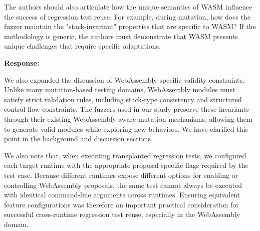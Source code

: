 \documentclass[11pt]{article}
\newenvironment{response}{%
    \par\vspace{10pt}
    \par\noindent\textbf{\color{tseblue}Response:}\par\nobreak\ignorespaces
}{%
    \par\vspace{15pt}
}
\newcounter{reviewernum}
\newcounter{cmtcounter}[reviewernum]
\newenvironment{rcomment}{%
    \stepcounter{cmtcounter}%
    \begin{revcomment}[R\thereviewernum{}.C\thecmtcounter{}.~Reviewer~\thereviewernum{}, Comment~\thecmtcounter]
}{%
    \end{revcomment}
}
\begin{document}
\begin{rcomment}
    The authors should also articulate how the unique semantics of WASM influence the success of regression test reuse. For example, during mutation, how does the fuzzer maintain the "stack-invariant" properties that are specific to WASM? If the methodology is generic, the authors must demonstrate that WASM presents unique challenges that require specific adaptations.
\end{rcomment}
\begin{response}
    We also expanded the discussion of WebAssembly-specific validity constraints. Unlike many mutation-based testing domains, WebAssembly modules must satisfy strict validation rules, including stack-type consistency and structured control-flow constraints. The fuzzers used in our study preserve these invariants through their existing WebAssembly-aware mutation mechanisms, allowing them to generate valid modules while exploring new behaviors. We have clarified this point in the background and discussion sections.

    We also note that, when executing transplanted regression tests, we configured each target runtime with the appropriate proposal-specific flags required by the test case. Because different runtimes expose different options for enabling or controlling WebAssembly proposals, the same test cannot always be executed with identical command-line arguments across runtimes. Ensuring equivalent feature configurations was therefore an important practical consideration for successful cross-runtime regression test reuse, especially in the WebAssembly domain.

\end{response}
\end{document}
